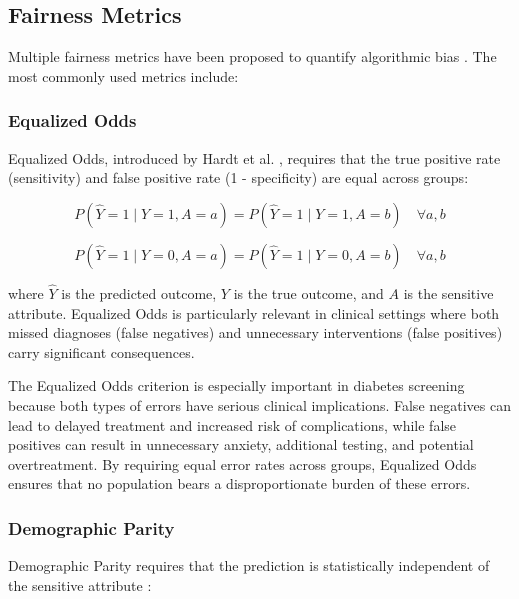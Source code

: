 \subsection{Fairness Metrics}

Multiple fairness metrics have been proposed to quantify algorithmic bias 
\cite{corbett2018}. The most commonly used metrics include:

\subsubsection{Equalized Odds}

Equalized Odds, introduced by Hardt et al. \cite{hardt2016}, requires that 
the true positive rate (sensitivity) and false positive rate (1 - specificity) 
are equal across groups:

\begin{equation}
P(\hat{Y}=1 \mid Y=1, A=a) = P(\hat{Y}=1 \mid Y=1, A=b) \quad \forall a,b
\label{eq:eo_tpr}
\end{equation}

\begin{equation}
P(\hat{Y}=1 \mid Y=0, A=a) = P(\hat{Y}=1 \mid Y=0, A=b) \quad \forall a,b
\label{eq:eo_fpr}
\end{equation}

\noindent where $\hat{Y}$ is the predicted outcome, $Y$ is the true outcome, 
and $A$ is the sensitive attribute. Equalized Odds is particularly relevant 
in clinical settings where both missed diagnoses (false negatives) and 
unnecessary interventions (false positives) carry significant consequences.

The Equalized Odds criterion is especially important in diabetes screening 
because both types of errors have serious clinical implications. False 
negatives can lead to delayed treatment and increased risk of complications, 
while false positives can result in unnecessary anxiety, additional testing, 
and potential overtreatment. By requiring equal error rates across groups, 
Equalized Odds ensures that no population bears a disproportionate burden 
of these errors.

\subsubsection{Demographic Parity}

Demographic Parity requires that the prediction is statistically independent 
of the sensitive attribute \cite{dwork2012}:

